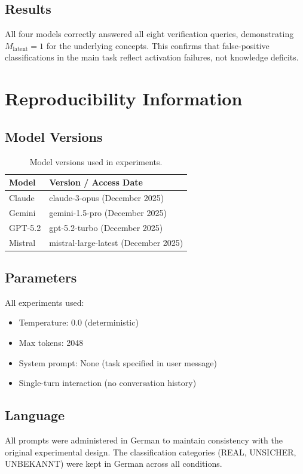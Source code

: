 \subsection{Results}

All four models correctly answered all eight verification queries, demonstrating $M_{\text{latent}} = 1$ for the underlying concepts. This confirms that false-positive classifications in the main task reflect activation failures, not knowledge deficits.


\section{Reproducibility Information}
\label{app:reproducibility}

\subsection{Model Versions}

\begin{table}[h]
\centering
\begin{tabular}{ll}
\toprule
\textbf{Model} & \textbf{Version / Access Date} \\
\midrule
Claude & claude-3-opus (December 2025) \\
Gemini & gemini-1.5-pro (December 2025) \\
GPT-5.2 & gpt-5.2-turbo (December 2025) \\
Mistral & mistral-large-latest (December 2025) \\
\bottomrule
\end{tabular}
\caption{Model versions used in experiments.}
\end{table}

\subsection{Parameters}

All experiments used:
\begin{itemize}
    \item Temperature: 0.0 (deterministic)
    \item Max tokens: 2048
    \item System prompt: None (task specified in user message)
    \item Single-turn interaction (no conversation history)
\end{itemize}

\subsection{Language}

All prompts were administered in German to maintain consistency with the original experimental design. The classification categories (REAL, UNSICHER, UNBEKANNT) were kept in German across all conditions.

